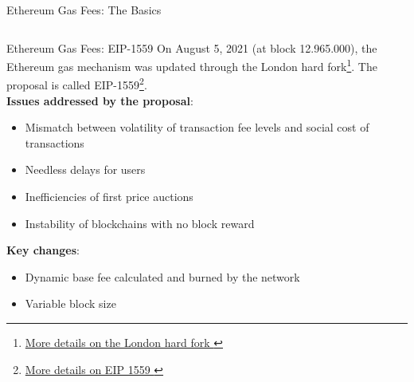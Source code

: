 \documentclass[]{beamer}
\begin{document}
\begin{frame}{Ethereum Gas Fees: The Basics}
\begin{itemize}
\begin{columns}
\begin{column}{0.02\textwidth}
				\end{column}
			\end{columns}
	\end{itemize} 
\end{frame}

\begin{frame}{Ethereum Gas Fees: EIP-1559}
	On August 5, 2021 (at block 12.965.000), the Ethereum gas mechanism was updated through the London hard fork\footnote{\href{https://ethereum.org/en/history/\#london}{More details on the London hard fork \link}}. The proposal is called EIP-1559\footnote{\href{https://eips.ethereum.org/EIPS/eip-1559}{More details on EIP 1559 \link}}.\\
	\vspace{0.2cm}
	\textbf{Issues addressed by the proposal}:
	\begin{itemize}
		\item Mismatch between volatility of transaction fee levels and social cost of transactions
		\item Needless delays for users
		\item Inefficiencies of first price auctions
		\item Instability of blockchains with no block reward
	\end{itemize}
	\textbf{Key changes}:
	\begin{itemize}
		\item Dynamic base fee calculated and burned by the network
		\item Variable block size
	\end{itemize}
\end{frame}
\end{document}
